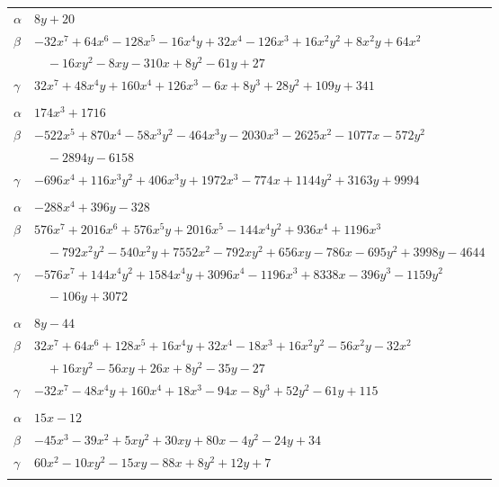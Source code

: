 \documentclass[11pt]{article}
\begin{document}
\begin{longtable}{@{}ll@{}}
$\alpha$ & $8y+20$\\
$\beta$ & $-32x^{7}+64x^{6}-128x^{5}-16x^{4}y+32x^{4}-126x^{3}+16x^{2}y^{2}+8x^{2}y+64x^{2}$\\
 & $\quad -16xy^{2}-8xy-310x+8y^{2}-61y+27$\\
$\gamma$ & $32x^{7}+48x^{4}y+160x^{4}+126x^{3}-6x+8y^{3}+28y^{2}+109y+341$\\
\addlinespace[3pt]
\multicolumn{2}{@{}l}{$\{i,j\}=\{76,94\}$, $k_{ij}=2^{2}\cdot 3^{5}\cdot 5\cdot 7$}\\
$\alpha$ & $174x^{3}+1716$\\
$\beta$ & $-522x^{5}+870x^{4}-58x^{3}y^{2}-464x^{3}y-2030x^{3}-2625x^{2}-1077x-572y^{2}$\\
 & $\quad -2894y-6158$\\
$\gamma$ & $-696x^{4}+116x^{3}y^{2}+406x^{3}y+1972x^{3}-774x+1144y^{2}+3163y+9994$\\
\addlinespace[3pt]
\multicolumn{2}{@{}l}{$\{i,j\}=\{78,81\}$, $k_{ij}=2^{8}\cdot 11$}\\
$\alpha$ & $-288x^{4}+396y-328$\\
$\beta$ & $576x^{7}+2016x^{6}+576x^{5}y+2016x^{5}-144x^{4}y^{2}+936x^{4}+1196x^{3}$\\
 & $\quad -792x^{2}y^{2}-540x^{2}y+7552x^{2}-792xy^{2}+656xy-786x-695y^{2}+3998y-4644$\\
$\gamma$ & $-576x^{7}+144x^{4}y^{2}+1584x^{4}y+3096x^{4}-1196x^{3}+8338x-396y^{3}-1159y^{2}$\\
 & $\quad -106y+3072$\\
\addlinespace[3pt]
\multicolumn{2}{@{}l}{$\{i,j\}=\{79,82\}$, $k_{ij}=2^{4}\cdot 3\cdot 5$}\\
$\alpha$ & $8y-44$\\
$\beta$ & $32x^{7}+64x^{6}+128x^{5}+16x^{4}y+32x^{4}-18x^{3}+16x^{2}y^{2}-56x^{2}y-32x^{2}$\\
 & $\quad +16xy^{2}-56xy+26x+8y^{2}-35y-27$\\
$\gamma$ & $-32x^{7}-48x^{4}y+160x^{4}+18x^{3}-94x-8y^{3}+52y^{2}-61y+115$\\
\addlinespace[3pt]
\multicolumn{2}{@{}l}{$\{i,j\}=\{80,88\}$, $k_{ij}=3^{2}\cdot 7$}\\
$\alpha$ & $15x-12$\\
$\beta$ & $-45x^{3}-39x^{2}+5xy^{2}+30xy+80x-4y^{2}-24y+34$\\
$\gamma$ & $60x^{2}-10xy^{2}-15xy-88x+8y^{2}+12y+7$\\
\addlinespace[3pt]
\multicolumn{2}{@{}l}{$\{i,j\}=\{83,94\}$, $k_{ij}=2$}\\

\end{longtable}
\end{document}
